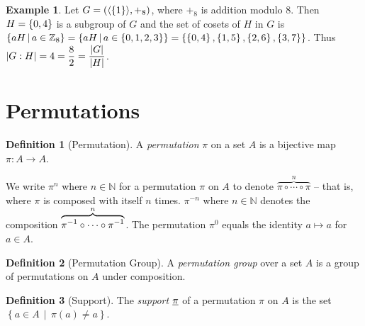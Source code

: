 \documentclass[a4paper,twoside,12pt,openany]{report}
\theoremstyle{plain}
\newtheorem{theorem}{Theorem}
\theoremstyle{definition}
\newtheorem{definition}{Definition}
\newtheorem{example}{Example}
\theoremstyle{remark}
\begin{document}
\begin{example}
	Let \(G=\left(\langle\left\{ 1 \right\}\rangle, +_8\right)\), where \(+_8\) is addition modulo \(8\). Then \(H=\left\{ 0,4 \right\}\) is a subgroup of \(G\) and the set of cosets of \(H\) in \(G\) is \(\left\{ aH \,\middle|\, a\in\mathbb{Z}_8 \right\}=\left\{ aH \,\middle|\, a\in\left\{ 0,1,2,3 \right\} \right\}=\left\{ \left\{ 0,4 \right\},\left\{ 1,5 \right\},\left\{ 2,6 \right\},\left\{ 3,7 \right\} \right\}\). Thus \(\left|G:H\right|=4=\dfrac{8}{2}=\dfrac{\left|G\right|}{\left|H\right|}\).
\end{example}


\section{Permutations}

\begin{definition}[Permutation]
	A \emph{permutation} \(\pi\) on a set \(A\) is a bijective map \(\pi:A\to A\).
\end{definition}

We write \(\pi^n\) where \(n\in\mathbb{N}\) for a permutation \(\pi\) on \(A\) to denote \(\overset{n}{\overbrace{\pi\circ\cdots\circ\pi}}\) -- that is, where \(\pi\) is composed with itself \(n\) times.
\(\pi^{-n}\) where \(n\in\mathbb{N}\) denotes the composition \(\overset{n}{\overbrace{\pi^{-1}\circ\cdots\circ\pi^{-1}}}\). The permutation \(\pi^0\) equals the identity \(a\mapsto a\) for \(a\in A\).



\begin{definition}[Permutation Group]
	A \emph{permutation group} over a set \(A\) is a group of permutations on \(A\) under composition.
\end{definition}

\begin{definition}[Support]
	The \emph{support} \(\underline{\pi}\) of a permutation \(\pi\) on \(A\) is the set \(\left\{a\in A \,\middle|\, \pi(a)\neq a\right\}\).
\end{definition}
\end{document}
